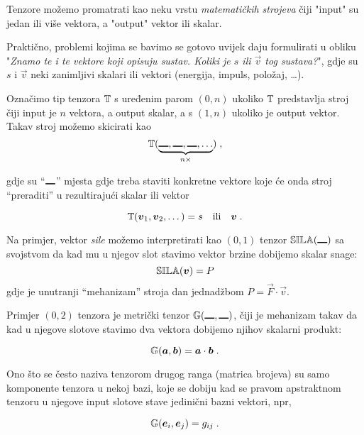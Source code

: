 Tenzore možemo promatrati kao neku vrstu \emph{matematičkih strojeva}
\cite{MTW:2017}
čiji "input" su jedan ili više vektora, a "output" vektor ili
skalar. 

Praktično, problemi kojima se bavimo se gotovo uvijek daju formulirati
u obliku "\emph{Znamo te i te vektore koji opisuju sustav. Koliki
je $s$ ili $\vec{v}$ tog sustava?}", gdje su $s$ i $\vec{v}$ neki
zanimljivi skalari ili vektori (energija, impuls, položaj, \dots).

Označimo tip tenzora $\mathbb{T}$ s uređenim parom $(0, n)$ ukoliko 
$\mathbb{T}$ predstavlja stroj čiji input je $n$ vektora, a output skalar,
a s $(1, n)$ ukoliko je output vektor. Takav stroj
možemo skicirati kao
\begin{equation}
   \bbtensor{T}(\underbrace{\slot, \slot, \slot, \dots}_{n \times})  \;,
\end{equation}

gdje su ``$\rule{1em}{1pt}$'' mjesta gdje treba staviti konkretne vektore
koje će onda stroj ``preraditi'' u rezultirajući skalar ili vektor

\begin{equation}
   \bbtensor{T}(\vec{v}_1, \vec{v}_2, \dots) = s \quad \text{ili} \quad \vec{v} \;.
\end{equation}

Na primjer, vektor \emph{sile} možemo interpretirati kao
$(0, 1)$ tenzor $\bbtensor{SILA}(\slot)$ sa svojstvom da kad mu
u njegov slot stavimo vektor brzine dobijemo skalar snage:
\begin{equation}
   \bbtensor{SILA}(\vec{v}) = P
\end{equation}
gdje je unutranji ``mehanizam'' stroja dan jednadžbom $P = \vec{F}\cdot\vec{v}$.

Primjer $(0,2)$ tenzora je metrički tenzor $\bbtensor{G}(\slot, \slot)$,
čiji je mehanizam takav da kad u njegove slotove stavimo dva vektora
dobijemo njihov skalarni produkt:

\begin{equation}
   \bbtensor{G}(\vec{a}, \vec{b}) = \vec{a}\cdot\vec{b} \;.
\end{equation}

Ono što se često naziva tenzorom drugog ranga (matrica brojeva) su
samo komponente tenzora u nekoj bazi, koje se
dobiju kad se pravom apstraktnom tenzoru u njegove input slotove
stave jedinični bazni vektori, npr,

\begin{equation}
   \bbtensor{G}(\vec{e}_i, \vec{e}_j) = g_{ij} \;.
\label{eq:Gkomponente}
\end{equation}

